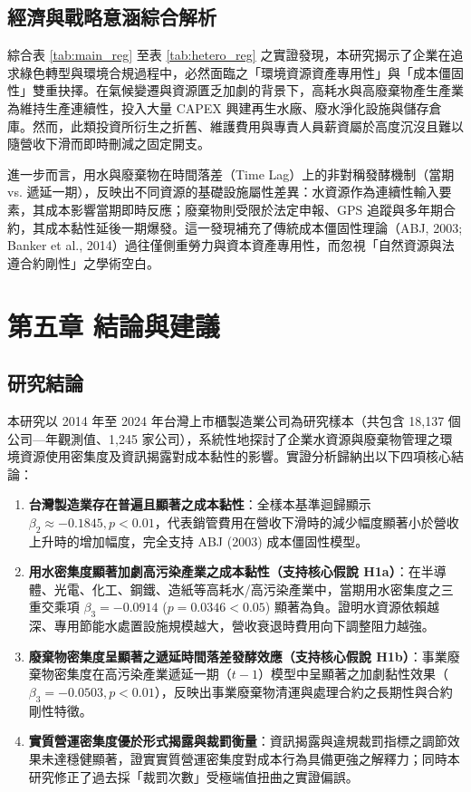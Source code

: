 \documentclass[12pt,a4paper]{article}
\begin{document}
\subsection{經濟與戰略意涵綜合解析}

綜合表 \ref{tab:main_reg} 至表 \ref{tab:hetero_reg} 之實證發現，本研究揭示了企業在追求綠色轉型與環境合規過程中，必然面臨之「環境資源資產專用性」與「成本僵固性」雙重抉擇。在氣候變遷與資源匱乏加劇的背景下，高耗水與高廢棄物產生產業為維持生產連續性，投入大量 CAPEX 興建再生水廠、廢水淨化設施與儲存倉庫。然而，此類投資所衍生之折舊、維護費用與專責人員薪資屬於高度沉沒且難以隨營收下滑而即時刪減之固定開支。

進一步而言，用水與廢棄物在時間落差（Time Lag）上的非對稱發酵機制（當期 vs. 遞延一期），反映出不同資源的基礎設施屬性差異：水資源作為連續性輸入要素，其成本影響當期即時反應；廢棄物則受限於法定申報、GPS 追蹤與多年期合約，其成本黏性延後一期爆發。這一發現補充了傳統成本僵固性理論（ABJ, 2003; Banker et al., 2014）過往僅側重勞力與資本資產專用性，而忽視「自然資源與法遵合約剛性」之學術空白。

\newpage

\section{第五章 結論與建議}

\subsection{研究結論}

本研究以 2014 年至 2024 年台灣上市櫃製造業公司為研究樣本（共包含 18,137 個公司—年觀測值、1,245 家公司），系統性地探討了企業水資源與廢棄物管理之環境資源使用密集度及資訊揭露對成本黏性的影響。實證分析歸納出以下四項核心結論：

\begin{enumerate}[leftmargin=*]
    \item \textbf{台灣製造業存在普遍且顯著之成本黏性}：全樣本基準迴歸顯示 $\beta_2 \approx -0.1845, p < 0.01$，代表銷管費用在營收下滑時的減少幅度顯著小於營收上升時的增加幅度，完全支持 ABJ (2003) 成本僵固性模型。
    \item \textbf{用水密集度顯著加劇高污染產業之成本黏性（支持核心假說 H1a）}：在半導體、光電、化工、鋼鐵、造紙等高耗水/高污染產業中，當期用水密集度之三重交乘項 $\beta_3 = -0.0914$ ($p = 0.0346 < 0.05$) 顯著為負。證明水資源依賴越深、專用節能水處置設施規模越大，營收衰退時費用向下調整阻力越強。
    \item \textbf{廢棄物密集度呈顯著之遞延時間落差發酵效應（支持核心假說 H1b）}：事業廢棄物密集度在高污染產業遞延一期（$t-1$）模型中呈顯著之加劇黏性效果（$\beta_3 = -0.0503, p < 0.01$），反映出事業廢棄物清運與處理合約之長期性與合約剛性特徵。
    \item \textbf{實質營運密集度優於形式揭露與裁罰衡量}：資訊揭露與違規裁罰指標之調節效果未達穩健顯著，證實實質營運密集度對成本行為具備更強之解釋力；同時本研究修正了過去採「裁罰次數」受極端值扭曲之實證偏誤。
\end{enumerate}
\end{document}
